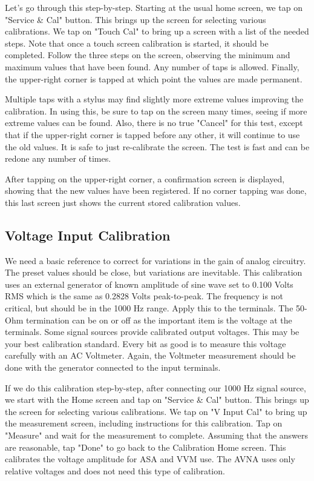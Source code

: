 Let's go through this step-by-step.  Starting at the usual home screen, we tap on "\textsf{Service \& Cal}" button. This brings up the screen for selecting various calibrations.  We tap on "\textsf{Touch Cal}" to bring up a screen with a list of the needed steps. Note that once a touch screen calibration is started, it should be completed.  Follow  the three steps on the screen, observing the minimum and maximum values that have been found.  Any number of taps is allowed.  Finally,  the upper-right corner is tapped at which point the values are made permanent.

Multiple taps with a stylus may find slightly more extreme values improving the calibration.   In using this, be sure to tap on the screen many times, seeing if more extreme values can be found.  Also, there is no true "Cancel" for this test, except that if the upper-right corner is tapped before any  other, it will continue to use the old values.  It is safe to just re-calibrate the screen.  The test is fast and can be redone any number of times.

After tapping on the upper-right corner, a confirmation screen is displayed, showing that the new values have been registered.  If no corner tapping was done, this last screen just shows the current stored calibration values.

\subsection{Voltage Input Calibration} We need a basic reference to correct for variations in the gain of analog circuitry.  The preset values should be close, but variations are inevitable.  This calibration uses an external generator of known amplitude of sine wave set to 0.100 Volts RMS which is the same as 0.2828 Volts peak-to-peak. The frequency is not critical, but should be in the 1000 Hz range.  Apply this to the  terminals.  The 50-Ohm termination can be on or off as the important item is the voltage at the terminals.  Some signal sources provide calibrated output voltages.  This may be your best calibration standard.  Every bit as good is to measure this voltage carefully with an AC Voltmeter.  Again, the Voltmeter measurement should be done with the generator connected to the  input terminals.

If we do this calibration step-by-step, after connecting our 1000 Hz signal source,  we start with the Home screen and tap on "\textsf{Service \& Cal}" button. This brings up the screen for selecting various calibrations.  We tap on "\textsf{V Input Cal}" to bring up the measurement screen, including instructions for this calibration.  Tap on "\textsf{Measure}" and wait for the measurement to complete.  Assuming that the answers are reasonable, tap "\textsf{Done}" to go back to the Calibration Home screen.  This calibrates the voltage amplitude for ASA and VVM use.  The AVNA uses only relative voltages and does not need this type of calibration.

